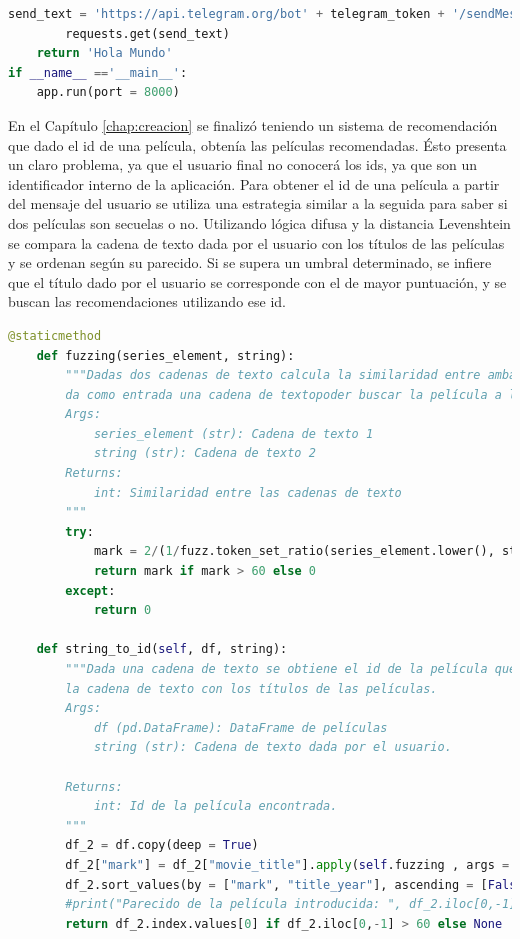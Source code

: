 \begin{lstlisting}[language=Python, label = {lst:API}, caption= Creación de la API del sistema de recomendación en Python usando Flask.]
        send_text = 'https://api.telegram.org/bot' + telegram_token + '/sendMessage?chat_id=' + chat_id + '&parse_mode=Markdown&text=' + answer
        requests.get(send_text)
    return 'Hola Mundo'
if __name__ =='__main__':
    app.run(port = 8000)
\end{lstlisting}

En el Capítulo \ref{chap:creacion} se finalizó teniendo un sistema de recomendación que dado el id de una película, obtenía las películas recomendadas. Ésto presenta un claro problema, ya que el usuario final no conocerá los ids, ya que son un identificador interno de la aplicación. Para obtener el id de una película a partir del mensaje del usuario se utiliza una estrategia similar a la seguida para saber si dos películas son secuelas o no. Utilizando lógica difusa y la distancia Levenshtein se compara la cadena de texto dada por el usuario con los títulos de las películas y se ordenan según su parecido. Si se supera un umbral determinado, se infiere que el título dado por el usuario se corresponde con el de mayor puntuación, y se buscan las recomendaciones utilizando ese id.

\begin{lstlisting}[language=Python, label = {lst:API}, caption= Búsqueda del id de la película dada por el usuario.]
    @staticmethod
    def fuzzing(series_element, string):
        """Dadas dos cadenas de texto calcula la similaridad entre ambas. Se usa para cuando el usuario
        da como entrada una cadena de textopoder buscar la película a la que se refiere.
        Args:
            series_element (str): Cadena de texto 1
            string (str): Cadena de texto 2
        Returns:
            int: Similaridad entre las cadenas de texto
        """
        try:
            mark = 2/(1/fuzz.token_set_ratio(series_element.lower(), string.lower()) + 1/fuzz.ratio(series_element.lower(), string.lower()))
            return mark if mark > 60 else 0
        except:
            return 0

    def string_to_id(self, df, string):
        """Dada una cadena de texto se obtiene el id de la película que más se parece. Para ello se compara
        la cadena de texto con los títulos de las películas.
        Args:
            df (pd.DataFrame): DataFrame de películas
            string (str): Cadena de texto dada por el usuario.
        
        Returns:
            int: Id de la película encontrada.
        """
        df_2 = df.copy(deep = True)
        df_2["mark"] = df_2["movie_title"].apply(self.fuzzing , args = (string,))
        df_2.sort_values(by = ["mark", "title_year"], ascending = [False, True], inplace = True)
        #print("Parecido de la película introducida: ", df_2.iloc[0,-1])
        return df_2.index.values[0] if df_2.iloc[0,-1] > 60 else None
\end{lstlisting}

